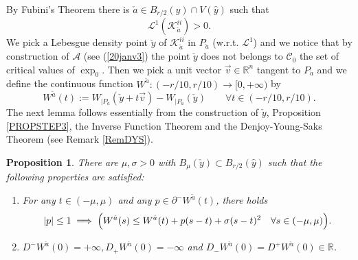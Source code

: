 \documentclass[JEP,XML,SOM,Unicode,NoFloatCountersInSection,published]{cedram}
\newenvironment{enumeratei}
{\bgroup\def\theenumi{\roman{enumi}}\def\theenumii{\arabic{enumii}}\begin{enumerate}}
{\end{enumerate}\egroup}
\newcommand\R{\mathbb R}
\newtheorem{proposition}[theorem]{Proposition}
\theoremstyle{definition}
\begin{document}
By Fubini's Theorem there is $\check{a}\in B_{r/2}(\hat{y})\cap V(\hat{y})$ such that
\begin{equation}\label{lastcontradiction}
\mathcal{L}^1 \left(\mathcal{K}_{\check{a}}^{ii}\right) >0.
\end{equation}
We pick a Lebesgue density point $\check{y}$ of $\mathcal{K}_{\check{a}}^{ii}$ in $P_{\check{a}}$ (w.r.t. $\mathcal{L}^1$) and we notice that by construction of $\mathcal{A}$ (see (\ref{20janv3}) the point $\check{y}$ does not belongs to $\mathcal{C}_0$ the set of critical values of $\exp_0$. Then we pick a unit vector $\vec{v} \in \R^n$ tangent to $P_{\check{a}}$ and we define the continuous function $W^{\check{a}}: (-r/10,r/10) \to [0,+\infty)$ by
\[
W^{\check{a}}(t) := W_{|P_{\check{a}}} \left(\check{y} + t \vec{v}\right)- W_{|P_{\check{a}}} \left(\check{y}\right)\qquad \forall t \in (-r/10,r/10).
\]
The next lemma follows essentially from the construction of $\check{y}$, Proposition \ref{PROPSTEP3}, the Inverse Function Theorem and the Denjoy-Young-Saks Theorem (see Remark \ref{RemDYS}).

\begin{proposition}\label{PROPSTEP4}
There are $\mu, \sigma >0$ with $B_{\mu}(\check{y}) \subset B_{r/2}(\hat{y})$ such that the following properties are satisfied:
\begin{enumeratei}
\item\label{PROPSTEP4i}
For any $t\in (-\mu,\mu)$ and any $p \in \partial^-W^{\check{a}}(t)$, there holds
\begin{equation*}
|p| \leq 1 \implies \Bigl(W^{\check{a}}(s) \leq W^{\check{a}}(t) + p (s-t)+\sigma (s-t)^2 \quad \forall s \in (-\mu,\mu)\Bigr).
\end{equation*}
\item\label{PROPSTEP4ii}
$D^-W^{\check{a}}(0)=+\infty, D_+W^{\check{a}}(0)=-\infty$ and $D_-W^{\check{a}}(0)=D^+W^{\check{a}}(0)\in \R$.
\end{enumeratei}
\end{proposition}
\end{document}
